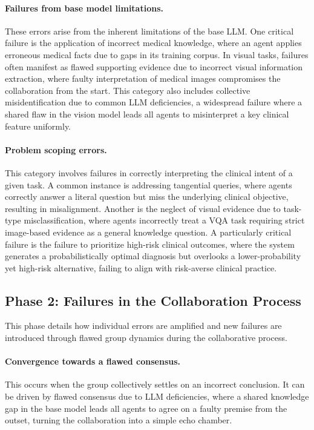 \documentclass{article}
\begin{document}
\paragraph{Failures from base model limitations.}
These errors arise from the inherent limitations of the base LLM. One critical failure is the application of incorrect medical knowledge, where an agent applies erroneous medical facts due to gaps in its training corpus. In visual tasks, failures often manifest as flawed supporting evidence due to incorrect visual information extraction, where faulty interpretation of medical images compromises the collaboration from the start. This category also includes collective misidentification due to common LLM deficiencies, a widespread failure where a shared flaw in the vision model leads all agents to misinterpret a key clinical feature uniformly.

\paragraph{Problem scoping errors.}
This category involves failures in correctly interpreting the clinical intent of a given task. A common instance is addressing tangential queries, where agents correctly answer a literal question but miss the underlying clinical objective, resulting in misalignment. Another is the neglect of visual evidence due to task-type misclassification, where agents incorrectly treat a VQA task requiring strict image-based evidence as a general knowledge question. A particularly critical failure is the failure to prioritize high-risk clinical outcomes, where the system generates a probabilistically optimal diagnosis but overlooks a lower-probability yet high-risk alternative, failing to align with risk-averse clinical practice.

\subsection{Phase 2: Failures in the Collaboration Process}
This phase details how individual errors are amplified and new failures are introduced through flawed group dynamics during the collaborative process.

\paragraph{Convergence towards a flawed consensus.}
This occurs when the group collectively settles on an incorrect conclusion. It can be driven by flawed consensus due to LLM deficiencies, where a shared knowledge gap in the base model leads all agents to agree on a faulty premise from the outset, turning the collaboration into a simple echo chamber.
\end{document}
